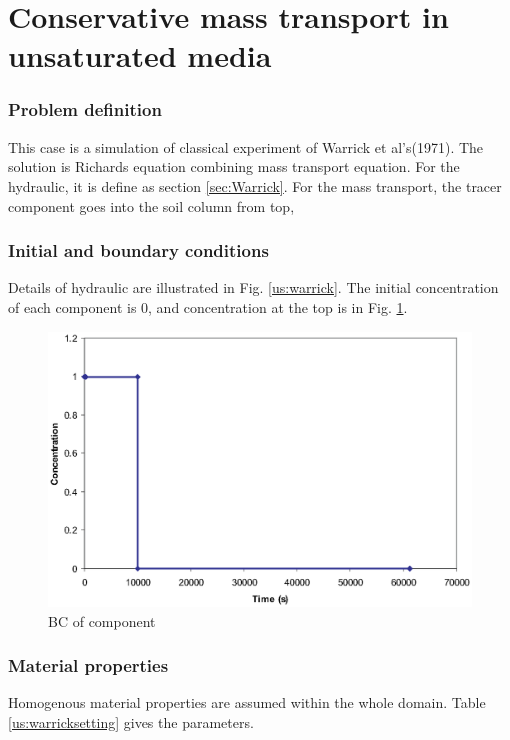 \section{Conservative mass transport in unsaturated media}

\subsubsection*{Problem definition}
This case is a simulation of classical experiment of Warrick et
al's(1971)\cite{Warrick:1971}. The solution is Richards equation
combining mass transport equation. For the hydraulic, it is define
as section \ref{sec:Warrick}. For the mass transport, the tracer
component goes into the soil column from top,
%
%
\subsubsection*{Initial and boundary conditions}
Details of hydraulic are illustrated in Fig. \ref{us:warrick}. The
initial concentration of each component is 0, and concentration at
the top is in Fig. \ref{usc:warrick}.
\begin{figure} [htb!]
 \centering
 \includegraphics[width=0.3\columnwidth] {H_US/figures/HMass_trace.eps}
 \caption{BC of component}
 \label{usc:warrick}
\end{figure}
\subsubsection*{Material properties}
Homogenous material properties are assumed within the whole
domain. Table \ref{us:warricksetting} gives the parameters.\\
